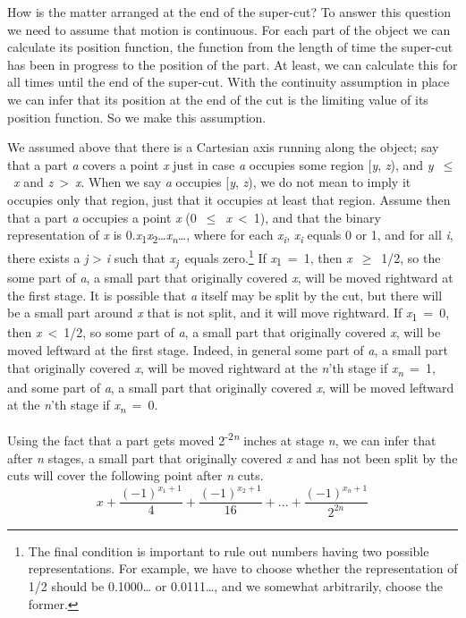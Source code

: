 \documentclass[
  11pt,
  letterpaper,
  DIV=11,
  numbers=noendperiod,
  twoside]{scrartcl}
\begin{document}
How is the matter arranged at the end of the super-cut? To answer this
question we need to assume that motion is continuous. For each part of
the object we can calculate its position function, the function from the
length of time the super-cut has been in progress to the position of the
part. At least, we can calculate this for all times until the end of the
super-cut. With the continuity assumption in place we can infer that its
position at the end of the cut is the limiting value of its position
function. So we make this assumption.

We assumed above that there is a Cartesian axis running along the
object; say that a part \emph{a} covers a point \emph{x} just in case
\emph{a} occupies some region {[}\emph{y}, \emph{z}), and
\emph{y}~\({\leq}\)~\emph{x} and \emph{z}~\textgreater~\emph{x}. When we
say \emph{a} occupies {[}\emph{y}, \emph{z}), we do not mean to imply it
occupies only that region, just that it occupies at least that region.
Assume then that a part \emph{a} occupies a point \emph{x}
(0~\({\leq}\)~\emph{x}~\textless~1), and that the binary representation
of \emph{x} is
0.\emph{x}\textsubscript{1}\emph{x}\textsubscript{2}\ldots{}\emph{x\textsubscript{n}}\ldots,
where for each \emph{x\textsubscript{i}}, \emph{x\textsubscript{i}}
equals 0 or 1, and for all \emph{i}, there exists a \emph{j}
\textgreater{} \emph{i} such that \emph{x\textsubscript{j}}~equals
zero.\footnote{The final condition is important to rule out numbers
  having two possible representations. For example, we have to choose
  whether the representation of 1/2 should be 0.1000\ldots{} or
  0.0111\ldots, and we somewhat arbitrarily, choose the former.} If
\emph{x}\textsubscript{1}~=~1, then \emph{x}~\({\geq}\)~1/2, so the some
part of \emph{a}, a small part that originally covered \emph{x}, will be
moved rightward at the first stage. It is possible that \emph{a} itself
may be split by the cut, but there will be a small part around \emph{x}
that is not split, and it will move rightward. If
\emph{x}\textsubscript{1}~=~0, then \emph{x}~\textless~1/2, so some part
of \emph{a}, a small part that originally covered \emph{x}, will be
moved leftward at the first stage. Indeed, in general some part of
\emph{a}, a small part that originally covered \emph{x}, will be moved
rightward at the \emph{n}'th stage if \emph{x\textsubscript{n}}~=~1, and
some part of \emph{a}, a small part that originally covered \emph{x},
will be moved leftward at the \emph{n}'th stage if
\emph{x\textsubscript{n}}~=~0.

Using the fact that a part gets moved 2\textsuperscript{-2\emph{n}}
inches at stage \emph{n}, we can infer that after \emph{n} stages, a
small part that originally covered \emph{x} and has not been split by
the cuts will cover the following point after \emph{n} cuts.
\[x + \frac{(-1)^{x_1 + 1}}{4} + \frac{(-1)^{x_2 + 1}}{16} + \dots + \frac{(-1)^{x_n + 1}}{2^{2n}}\]
\end{document}
